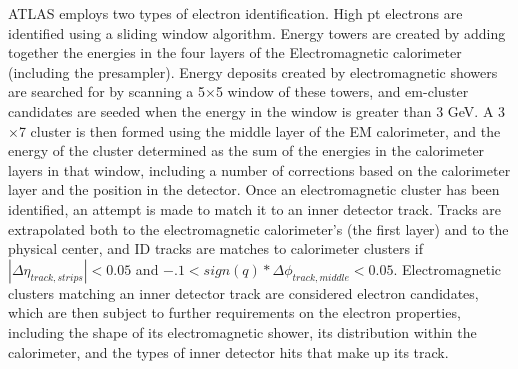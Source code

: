 
ATLAS employs two types of electron identification.
High pt electrons are identified using a sliding window algorithm.
Energy towers are created by adding together the energies in the four layers of the Electromagnetic calorimeter (including the presampler).
Energy deposits created by electromagnetic showers are searched for by scanning a 5$\times$5 window of these towers, and em-cluster candidates are seeded when the energy in the window is greater than 3 GeV.
A 3$\times$7 cluster is then formed using the middle layer of the EM calorimeter, and the energy of the cluster determined as the sum of the energies in the calorimeter layers in that window, including a number of corrections based on the calorimeter layer and the position in the detector.
Once an electromagnetic cluster has been identified, an attempt is made to match it to an inner detector track.
Tracks are extrapolated both to the electromagnetic calorimeter's (the first layer) and to the physical center, and ID tracks are matches to calorimeter clusters if $|\Delta \eta_{track, strips}| < 0.05$ and $-.1 < sign(q)*\Delta \phi_{track, middle} < 0.05$.
Electromagnetic clusters matching an inner detector track are considered electron candidates, which are then subject to further requirements on the electron properties, including the shape of its electromagnetic shower, its distribution within the calorimeter, and the types of inner detector hits that make up its track.





